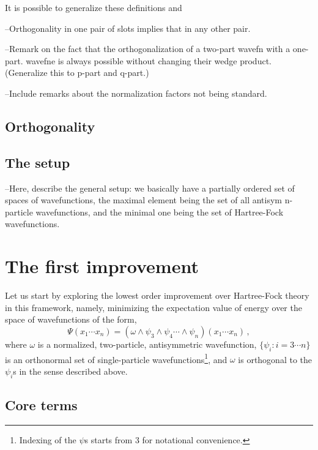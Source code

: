 \documentclass[11pt]{article}
\begin{document}
It is possible to generalize these definitions and 

--Orthogonality in one pair of slots implies that in any other pair.

--Remark on the fact that the orthogonalization of a two-part wavefn
  with a one-part. wavefne is always possible without changing their wedge
  product. (Generalize this to p-part and q-part.)

--Include remarks about the normalization factors not being standard.

\subsection{Orthogonality}

\subsection{The setup}

--Here, describe the general setup: we basically have a partially
ordered set of spaces of wavefunctions, the maximal element being the
set of all antisym n-particle wavefunctions, and the minimal one being
the set of Hartree-Fock wavefunctions.


\section{The first improvement}

Let us start by exploring the lowest order improvement over
Hartree-Fock theory in this framework, namely, minimizing the expectation
value of energy over the space of wavefunctions of the form,
\begin{equation}
  \Psi(x_1\cdots x_n) =
  (\omega\wedge\psi_3\wedge\psi_4\cdots\wedge\psi_n)(x_1\cdots x_n) \,,
\end{equation}
where $\omega$ is a normalized, two-particle, antisymmetric wavefunction,
$\{\psi_i: i=3\cdots n\}$ is an orthonormal set of single-particle
wavefunctions\footnote{Indexing of the $\psi$s starts from 3 for
 notational convenience.}, 
and $\omega$ is orthogonal to the $\psi_i$s in the sense
described above. %
\subsection{Core terms}
\end{document}
